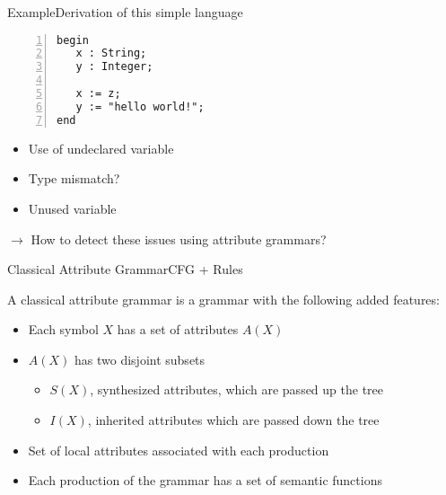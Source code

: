 \begin{frame}[fragile=singleslide]{Example}{Derivation of this simple language}

\begin{Verbatim}[fontsize=\scriptsize,numbers=left,xleftmargin=5mm]
begin
   x : String;
   y : Integer;
	
   x := z;
   y := "hello world!";
end
\end{Verbatim}

\newlinevspace

\begin{itemize}
    \item Use of undeclared variable
    \item Type mismatch?
    \item Unused variable
\end{itemize}

\newlinevspace

$\to$ How to detect these issues using attribute grammars?
\end{frame}


\begin{frame}{Classical Attribute Grammar}{CFG + Rules}


A classical attribute grammar is a \alert{grammar} with the following added features:

\begin{itemize}
    \item Each symbol $X$ has a set of attributes $A(X)$
    \item $A(X)$ has two disjoint subsets
    \begin{itemize}
        \item $S(X)$, synthesized attributes, which are passed up the tree
        \item $I(X)$, inherited attributes which are passed down the tree
    \end{itemize}
    \item Set of local attributes associated with each production
    \item Each production of the grammar has a set of semantic functions
\end{itemize}

\end{frame}

